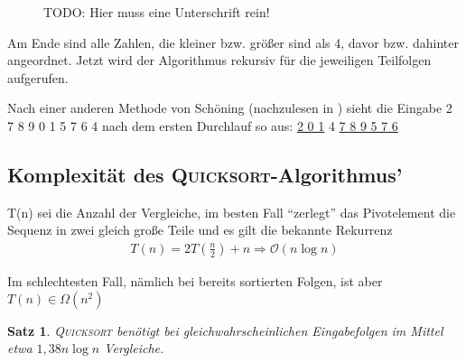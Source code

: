 \documentclass[ngerman,draft,parskip=half*,twoside]{scrreprt}
\theoremstyle{break}
\newtheorem{satz}{Satz}[chapter]
\theoremstyle{nonumberbreak}
\newcommand*{\OO}{\mathcal{O}}      %
\begin{document}
%
\begin{figure}[H]
  \centering
  
\caption{TODO: Hier muss eine Unterschrift rein!}
  \label{031103a}
\end{figure}

Am Ende sind alle Zahlen, die kleiner bzw. größer sind als 4, davor bzw. dahinter angeordnet. 
Jetzt wird der Algorithmus rekursiv für die jeweiligen Teilfolgen aufgerufen.

Nach einer anderen Methode von Schöning (nachzulesen in \cite{sedgewick}) sieht die Eingabe 2 7 8 9 0 1 5 7 6 4 nach dem ersten Durchlauf so aus: 
\underline{2 0 1} 4 \underline{7 8 9 5 7 6}

\subsection{Komplexität des \textsc{Quicksort}-Algorithmus'}

T(n) sei die Anzahl der Vergleiche, im besten Fall "`zerlegt"' das Pivotelement die Sequenz in zwei gleich große Teile und es gilt die
bekannte Rekurrenz
\begin{gather*}
T(n)=2T\left(\frac{n}{2}\right)+n \Rightarrow \OO(n \log n)
\end{gather*}

Im schlechtesten Fall, nämlich bei bereits sortierten Folgen, ist aber $T(n) \in \Omega(n^2)$ 

\begin{satz}
\textsc{Quicksort} benötigt bei gleichwahrscheinlichen Eingabefolgen im Mittel etwa $1,38 n \log n$ Vergleiche.
\end{satz}
\end{document}
